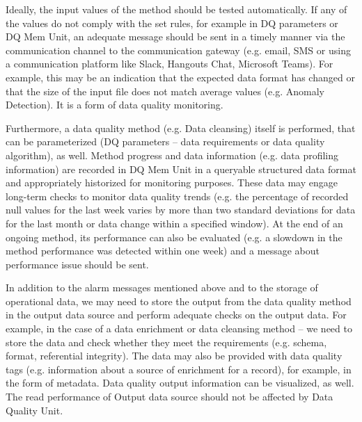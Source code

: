 				Ideally, the input values of the method should be tested automatically. If any of the values do not comply with the set rules, for example in DQ parameters or DQ Mem Unit, an adequate message should be sent in a timely manner via the communication channel to the communication gateway (e.g. email, SMS or using a communication platform like Slack, Hangouts Chat, Microsoft Teams). For example, this may be an indication that the expected data format has changed or that the size of the input file does not match average values (e.g. Anomaly Detection). It is a form of data quality monitoring.
			
				Furthermore, a data quality method (e.g. Data cleansing) itself is performed, that can be parameterized (DQ parameters -- data requirements or data quality algorithm), as well. Method progress and data information (e.g. data profiling information) are recorded in DQ Mem Unit in a queryable structured data format and appropriately historized for monitoring purposes. These data may engage long-term checks to monitor data quality trends (e.g. the percentage of recorded null values for the last week varies by more than two standard deviations for data for the last month or data change within a specified window). At the end of an ongoing method, its performance can also be evaluated (e.g. a slowdown in the method performance was detected within one week) and a message about performance issue should be sent.
		
				In addition to the alarm messages mentioned above and to the storage of operational data, we may need to store the output from the data quality method in the output data source and perform adequate checks on the output data. For example, in the case of a data enrichment or data cleansing method -- we need to store the data and check whether they meet the requirements (e.g. schema, format, referential integrity). The data may also be provided with data quality tags (e.g. information about a source of enrichment for a record), for example, in the form of metadata. Data quality output information can be visualized, as well. The read performance of Output data source should not be affected by Data Quality Unit.